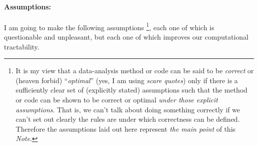 \documentclass[12pt,letterpaper]{article}
\newcommand{\documentname}{\textsl{Note}}
\begin{document}
\paragraph{Assumptions:}
I am going to make the following assumptions%
\footnote{It is my view that a data-analysis method or code
  can be said to be \emph{correct} or (heaven forbid)
  ``\emph{optimal}'' (yes, I am using \emph{scare quotes}) only if there
  is a sufficiently clear set of (explicitly stated) assumptions such
  that the method or code can be shown to be correct or optimal \emph{under
  those explicit assumptions}. That is, we can't talk about doing
  something correctly if we can't set out clearly the rules are under which
  correctness can be defined. Therefore the assumptions laid out here
  represent \emph{the main point} of this \documentname.},
each one of which is
questionable and unpleasant, but each one of which improves our
computational tractability.
\end{document}
